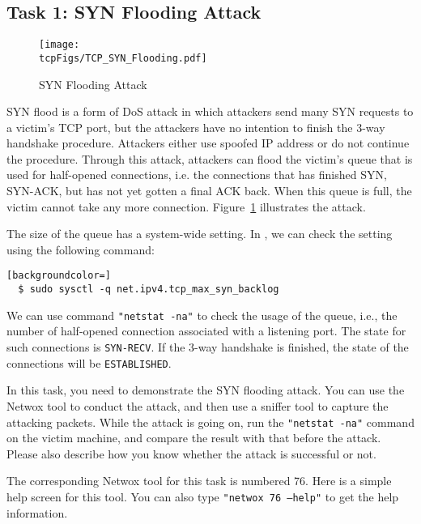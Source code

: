 \subsection {Task 1: SYN Flooding Attack}


\begin{figure}[htb]
  \begin{center}
    \texttt{[image: \\tcpFigs/TCP\_SYN\_Flooding.pdf]}
  \end{center}
  \caption{SYN Flooding Attack}
  \label{tcp:fig:synflooding}
\end{figure}
 


SYN flood is a form of DoS attack in which attackers send many SYN
requests to a victim's TCP port, but the attackers have no intention 
to finish the 3-way handshake procedure. Attackers either use spoofed 
IP address or do not continue the procedure. 
Through this attack, attackers can flood the victim's queue that is 
used for half-opened connections, i.e. the connections that has finished SYN, SYN-ACK, 
but has not yet gotten a final ACK back. When this queue is full, 
the victim cannot take any more connection. Figure~\ref{tcp:fig:synflooding}
illustrates the attack.

The size of the queue has a system-wide setting.  In \linux, we can check the
setting using the following command: 


\begin{lstlisting}[backgroundcolor=]
  $ sudo sysctl -q net.ipv4.tcp_max_syn_backlog
\end{lstlisting}

We can use command {\tt "netstat -na"} to check the usage of the queue, 
i.e., the number of half-opened connection associated with a listening port. 
The state for such connections is \texttt {SYN-RECV}. If the 3-way handshake
is finished, the state of the connections will be {\tt ESTABLISHED}.


In this task, you need to demonstrate the SYN flooding attack. You can 
use the Netwox tool to conduct the attack, and then use a sniffer 
tool to capture the attacking packets. While the attack is going on, 
run the {\tt "netstat -na"} command on the victim machine, and compare 
the result with that before the attack. 
Please also describe how you know whether the attack is 
successful or not. 

The corresponding Netwox tool for this task is numbered 76. Here is a
simple help screen for this tool. You can also type {\tt "netwox 76 --help"}
to get the help information.

